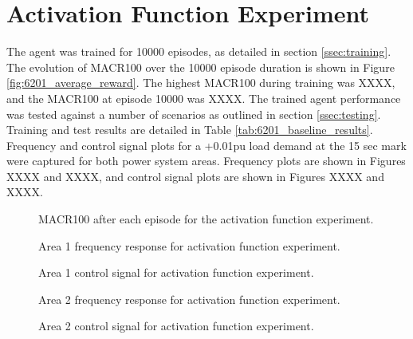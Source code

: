 \section{Activation Function Experiment}
The agent was trained for 10000 episodes, as detailed in section \ref{ssec:training}. The evolution of MACR100 over the 10000 episode duration is shown in Figure \ref{fig:6201_average_reward}. The highest MACR100 during training was XXXX, and the MACR100 at episode 10000 was XXXX. The trained agent performance was tested against a number of scenarios as outlined in section \ref{ssec:testing}. Training and test results are detailed in Table \ref{tab:6201_baseline_results}. Frequency and control signal plots for a +0.01pu load demand at the 15 sec mark were captured for both power system areas. Frequency plots are shown in Figures XXXX and XXXX, and control signal plots are shown in Figures XXXX and XXXX.

\begin{figure}[h]
	\centering
	
	\caption{MACR100 after each episode for the activation function experiment.}
\end{figure}



\begin{figure}[h]
	\centering
	
	
	\vspace{-0.5cm}
	\caption{Area 1 frequency response for activation function experiment.}
	
	\vspace{0.5cm}
	
	
	\vspace{-0.5cm}
	\caption{Area 1 control signal for activation function experiment.}
	
	\vspace{0.5cm}
	
	
	\vspace{-0.5cm}
	\caption{Area 2 frequency response for activation function experiment.}
	
	\vspace{0.5cm}
		
	
	\vspace{-0.5cm}
	\caption{Area 2 control signal for activation function experiment.}
\end{figure}